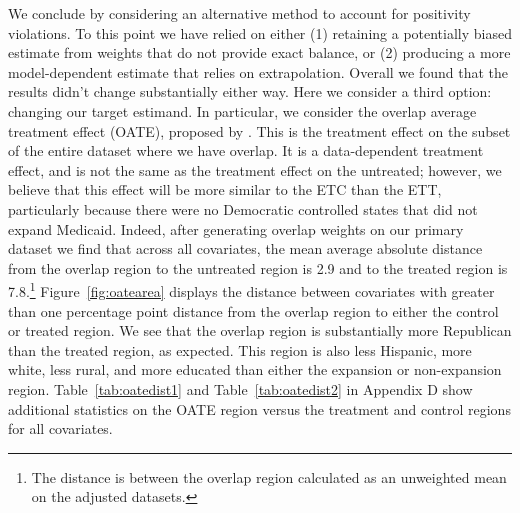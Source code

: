 \documentclass[12pt]{article}
\begin{document}
We conclude by considering an alternative method to account for positivity violations. To this point we have relied on either (1) retaining a potentially biased estimate from weights that do not provide exact balance, or (2) producing a more model-dependent estimate that relies on extrapolation. Overall we found that the results didn't change substantially either way. Here we consider a third option: changing our target estimand. In particular, we consider the overlap average treatment effect (OATE), proposed by \cite{li2018balancing}. This is the treatment effect on the subset of the entire dataset where we have overlap. It is a data-dependent treatment effect, and is not the same as the treatment effect on the untreated; however, we believe that this effect will be more similar to the ETC than the ETT, particularly because there were no Democratic controlled states that did not expand Medicaid. Indeed, after generating overlap weights on our primary dataset we find that across all covariates, the mean average absolute distance from the overlap region to the untreated region is 2.9 and to the treated region is 7.8.\footnote{The distance is between the overlap region calculated as an unweighted mean on the adjusted datasets.} Figure~\ref{fig:oatearea} displays the distance between covariates with greater than one percentage point distance from the overlap region to either the control or treated region. We see that the overlap region is substantially more Republican than the treated region, as expected. This region is also less Hispanic, more white, less rural, and more educated than either the expansion or non-expansion region. Table~\ref{tab:oatedist1} and Table~\ref{tab:oatedist2} in Appendix D show additional statistics on the OATE region versus the treatment and control regions for all covariates.
\end{document}
